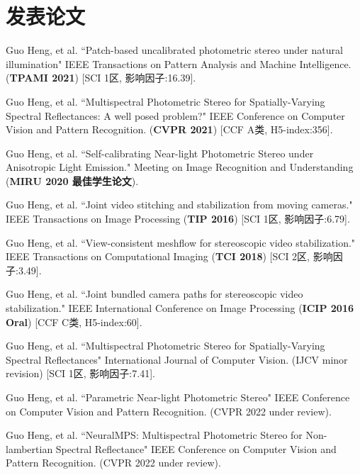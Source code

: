 \documentclass[A4, 11pt, UTF8]{ctexart}
\begin{document}
		\section{发表论文}
		\begin{enumerate}[label={[\arabic*]}]
			\item Guo Heng, et al. ``Patch-based uncalibrated photometric stereo under natural illumination" 
			IEEE Transactions on Pattern Analysis and Machine Intelligence. (\textbf{TPAMI 2021}) [SCI 1区, 影响因子:16.39]. 
			\item Guo Heng, et al. ``Multispectral Photometric Stereo for Spatially-Varying Spectral Reflectances: A well posed problem?" IEEE Conference on Computer Vision and Pattern Recognition. (\textbf{CVPR 2021}) [CCF A类, H5-index:356]. 
			\item Guo Heng, et al. ``Self-calibrating Near-light Photometric Stereo under Anisotropic Light Emission." Meeting on Image Recognition and Understanding (\textbf{MIRU 2020 最佳学生论文}).  
			\item Guo Heng, et al. ``Joint video stitching and stabilization from moving cameras." IEEE Transactions on Image Processing (\textbf{TIP 2016}) [SCI 1区, 影响因子:6.79].
			\item Guo Heng, et al. ``View-consistent meshflow for stereoscopic video stabilization." IEEE Transactions on Computational Imaging (\textbf{TCI 2018}) [SCI 2区, 影响因子:3.49].
			\item Guo Heng, et al. ``Joint bundled camera paths for stereoscopic video stabilization." IEEE International Conference on Image Processing (\textbf{ICIP 2016 Oral}) [CCF C类, H5-index:60].
			\item Guo Heng, et al. ``Multispectral Photometric Stereo for Spatially-Varying Spectral Reflectances" International Journal of Computer Vision. (IJCV minor revision) [SCI 1区, 影响因子:7.41]. 
			\item Guo Heng, et al. ``Parametric Near-light Photometric Stereo" IEEE Conference on Computer Vision and Pattern Recognition. (CVPR 2022 under review). 
			\item Guo Heng, et al. ``NeuralMPS: Multispectral Photometric Stereo for Non-lambertian Spectral Reflectance" IEEE Conference on Computer Vision and Pattern Recognition. (CVPR 2022 under review). 
		\end{enumerate}
		
	
\end{document}
